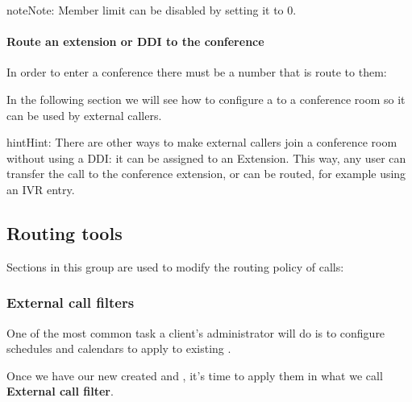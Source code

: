 \documentclass[letterpaper,10pt,english]{sphinxmanual}
\begin{document}
\begin{notice}{note}{Note:}
Member limit can be disabled by setting it to 0.
\end{notice}
\paragraph{Route an extension or DDI to the conference}

In order to enter a conference there must be a number that is route to them:

In the following section we will see how to configure a {\hyperref[administration_portal/client/vpbx/ddis:ddis]{}} to a conference room so it can be used by external callers.

\begin{notice}{hint}{Hint:}
There are other ways to make external callers join a conference room
without using a DDI: it can be assigned to an Extension. This way, any user
can transfer the call to the conference extension, or can be routed, for
example using an IVR entry.
\end{notice}


\subsection{Routing tools}
\label{administration_portal/client/vpbx/routing_tools/index::doc}\label{administration_portal/client/vpbx/routing_tools/index:routing-tools}
Sections in this group are used to modify the routing policy of calls:


\subsubsection{External call filters}
\label{administration_portal/client/vpbx/routing_tools/external_call_filters:external-call-filters}\label{administration_portal/client/vpbx/routing_tools/external_call_filters:external-filters}\label{administration_portal/client/vpbx/routing_tools/external_call_filters::doc}
One of the most common task a client's administrator will do is to
configure schedules and calendars to apply to existing {\hyperref[administration_portal/client/vpbx/ddis:ddis]{}}.

Once we have our new created {\hyperref[administration_portal/client/vpbx/routing_tools/schedules:schedules]{}} and {\hyperref[administration_portal/client/vpbx/routing_tools/calendars:calendars]{}}, it's time to apply them
in what we call \textbf{External call filter}.
\end{document}
